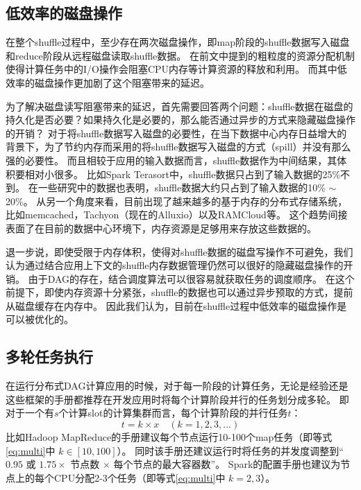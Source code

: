 \subsection{低效率的磁盘操作}
\label{subsec:size}

在整个shuffle过程中，至少存在两次磁盘操作，即map阶段的shuffle数据写入磁盘和reduce阶段从远程磁盘读取shuffle数据。
在前文中提到的粗粒度的资源分配机制使得计算任务中的I/O操作会阻塞CPU内存等计算资源的释放和利用。
而其中低效率的磁盘操作更加剧了这个阻塞带来的延迟。

为了解决磁盘读写阻塞带来的延迟，首先需要回答两个问题：shuffle数据在磁盘的持久化是否必要？如果持久化是必要的，那么能否通过异步的方式来隐藏磁盘操作的开销？
对于将shuffle数据写入磁盘的必要性，在当下数据中心内存日益增大的背景下，为了节约内存而采用的将shuffle数据写入磁盘的方式（spill）并没有那么强的必要性。
而且相较于应用的输入数据而言，shuffle数据作为中间结果，其体积要相对小很多。
比如Spark Terasort\cite{spark-tera}中，shuffle数据只占到了输入数据的25\%不到。
在一些研究中\cite{makingsense}的数据也表明，shuffle数据大约只占到了输入数据的10\% $\sim$ 20\%。
从另一个角度来看，目前出现了越来越多的基于内存的分布式存储系统，比如memcached\cite{memcached}，Tachyon\cite{tachyon}（现在的Alluxio\cite{alluxio}）以及RAMCloud\cite{ramcloud}等。
这个趋势间接表面了在目前的数据中心环境下，内存资源是足够用来存放这些数据的。

退一步说，即使受限于内存体积，使得对shuffle数据的磁盘写操作不可避免，我们认为通过结合应用上下文的shuffle内存数据管理仍然可以很好的隐藏磁盘操作的开销。
由于DAG的存在，结合调度算法可以很容易就获取任务的调度顺序。
在这个前提下，即使内存资源十分紧张，shuffle的数据也可以通过异步预取的方式，提前从磁盘缓存在内存中。
因此我们认为，目前在shuffle过程中低效率的磁盘操作是可以被优化的。

\subsection{多轮任务执行}

在运行分布式DAG计算应用的时候，对于每一阶段的计算任务，无论是经验还是这些框架的手册都推荐在开发应用时将每个计算阶段并行的任务划分成多轮。
即对于一个有$s$个计算slot的计算集群而言，每个计算阶段的并行任务$t$：
\begin{equation}
	\label{eq:multi}
	t = k \times x \quad (k = 1, 2, 3, ...)
\end{equation}
比如Hadoop MapReduce的手册\cite{hadooptutorial}建议每个节点运行10-100个map任务（即等式\ref{eq:multi}中 $k \in [10, 100]$）。
同时该手册还建议运行时将任务的并发度调整到“$0.95$ 或 $1.75 \times$ 节点数 $\times$ 每个节点的最大容器数”。
Spark的配置手册\cite{sparkconf}也建议为节点上的每个CPU分配2-3个任务（即等式\ref{eq:multi}中 $k = 2, 3$）。

